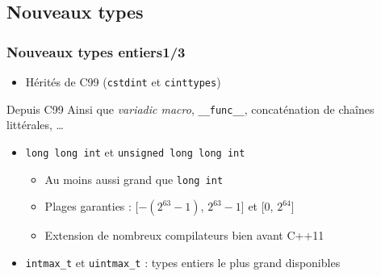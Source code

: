\documentclass[C++.tex]{subfiles}
\begin{document}
\subsection*{Nouveaux types}
\begin{frame}[fragile]
	\frametitle{Nouveaux types entiers\titlehfill{}1/3}
	\begin{itemize}
		\item Hérités de C99 (\lstinline[keywordstyle=\color{black}]|cstdint| et \lstinline|cinttypes|)
	\end{itemize}

	\begin{block}{Depuis C99}
		Ainsi que \textit{variadic macro}, \lstinline|__func__|, concaténation de chaînes littérales, \ldots
	\end{block}

	\begin{itemize}
		\item \lstinline|long long int| et \lstinline|unsigned long long int|
		\begin{itemize}
			\item Au moins aussi grand que \lstinline|long int|
			\item Plages garanties : [$-(2^{63}-1)$, $2^{63}-1$] et [$0$, $2^{64}$]
			\item Extension de nombreux compilateurs bien avant C++11
		\end{itemize}
		\item \lstinline|intmax_t| et \lstinline|uintmax_t| : types entiers le plus grand disponibles
	\end{itemize}
\end{frame}
\end{document}
